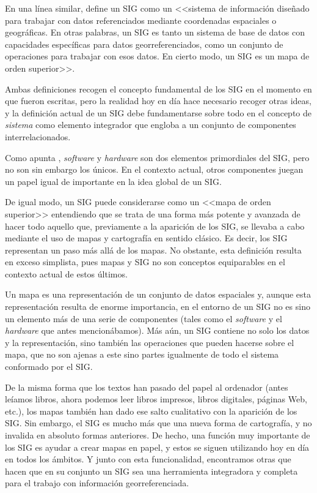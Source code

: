 En una línea similar, \cite{Star1990Prentice} define un SIG como un <<sistema de información diseñado para trabajar con datos referenciados mediante coordenadas espaciales o geográficas. En otras palabras, un SIG es tanto un sistema de base de datos con capacidades específicas para datos georreferenciados, como un conjunto de operaciones para trabajar con esos datos. En cierto modo, un SIG es un mapa de orden superior>>.

Ambas definiciones recogen el concepto fundamental de los SIG en el momento en que fueron escritas, pero la realidad hoy en día hace necesario recoger otras ideas, y la definición actual de un SIG debe fundamentarse sobre todo en el concepto de \emph{sistema} como elemento integrador que engloba a un conjunto de componentes interrelacionados.

Como apunta \cite{Tomlin1990Prentice}, \emph{software} y \emph{hardware} son dos elementos primordiales del SIG, pero no son sin embargo los únicos. En el contexto actual, otros componentes juegan un papel igual de importante en la idea global de un SIG.

De igual modo, un SIG puede considerarse como un <<mapa de orden superior>> entendiendo que se trata de una forma más potente y avanzada de hacer todo aquello que, previamente a la aparición de los SIG, se llevaba a cabo mediante el uso de mapas y cartografía en sentido clásico. Es decir, los SIG representan un paso más allá de los mapas. No obstante, esta definición resulta en exceso simplista, pues mapas y SIG no son conceptos equiparables en el contexto actual de estos últimos. 

Un mapa es una representación de un conjunto de datos espaciales y, aunque esta representación resulta de enorme importancia, en el entorno de un SIG no es sino un elemento más de una serie de componentes (tales como el \emph{software} y el \emph{hardware} que antes mencionábamos). Más aún, un SIG contiene no solo los datos y la representación, sino también las operaciones que pueden hacerse sobre el mapa, que no son ajenas a este sino partes igualmente de todo el sistema conformado por el SIG.

De la misma forma que los textos han pasado del papel al ordenador (antes leíamos libros, ahora podemos leer libros impresos, libros digitales, páginas Web, etc.), los mapas también han dado ese salto cualitativo con la aparición de los SIG. Sin embargo, el SIG es mucho más que una nueva forma de cartografía, y no invalida en absoluto formas anteriores. De hecho, una función muy importante de los SIG es ayudar a crear mapas en papel, y estos se siguen utilizando hoy en día en todos los ámbitos. Y junto con esta funcionalidad, encontramos otras que hacen que en su conjunto un SIG sea una herramienta integradora y completa para el trabajo con información georreferenciada.

